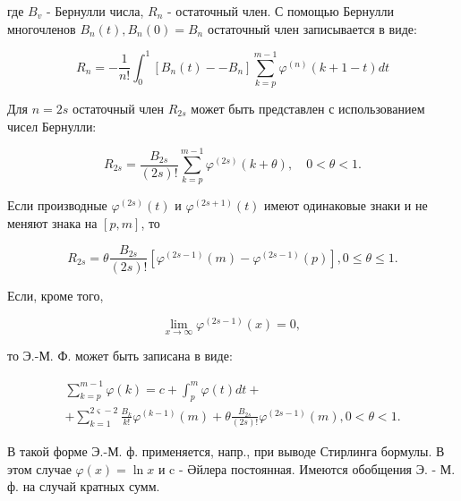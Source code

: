 \documentclass[10pt]{article}
\begin{document}
где $B_{v}$ - Бернулли числа, $R_{n}$ - остаточный член. С помощью Бернулли многочленов $B_{n}(t), B_{n}(0)=B_{n}$ остаточный член записывается в виде:



\[

R_{n}=-\frac{1}{n !} \int_{0}^{1}\left[B_{n}(t)--B_{n}\right] \sum_{k=p}^{m-1} \varphi^{(n)}(k+1-t) d t

\]



Для $n=2 s$ остаточный член $R_{2 s}$ может быть представлен с использованием чисел Бернулли:



\[

R_{2 s}=\frac{B_{2 s}}{(2 s) !} \sum_{k=p}^{m-1} \varphi^{(2 s)}(k+\theta), \quad 0<\theta<1 .

\]



Если производные $\varphi^{(2 s)}(t)$ и $\varphi^{(2 s+1)}(t)$ имеют одинаковые знаки и не меняют знака на $[p, m]$, то



\[

R_{2 s}=\theta \frac{B_{2 s}}{(2 s) !}\left[\varphi^{(2 s-1)}(m)-\varphi^{(2 s-1)}(p)\right], 0 \leqslant \theta \leqslant 1 .

\]



Если, кроме того,



\[

\lim _{x \rightarrow \infty} \varphi^{(2 s-1)}(x)=0 \text {, }

\]



то Э.-М. Ф. может быть записана в виде:



\[

\begin{gathered}

\sum_{k=p}^{m-1} \varphi(k)=c+\int_{p}^{m} \varphi(t) d t+ \\

+\sum_{k=1}^{2 \varsigma-2} \frac{B_{k}}{k !} \varphi^{(k-1)}(m)+\theta \frac{B_{2 s}}{(2 s) !} \varphi^{(2 s-1)}(m), 0<\theta<1 .

\end{gathered}

\]



В такой форме Э.-М. ф. применяется, напр., при выводе Стирлинга бормулы. В этом случае $\varphi(x)=\ln x$ и c - Әйлера постоянная. Имеются обобщения Э. - М. ф. на случай кратных сумм.
\end{document}
